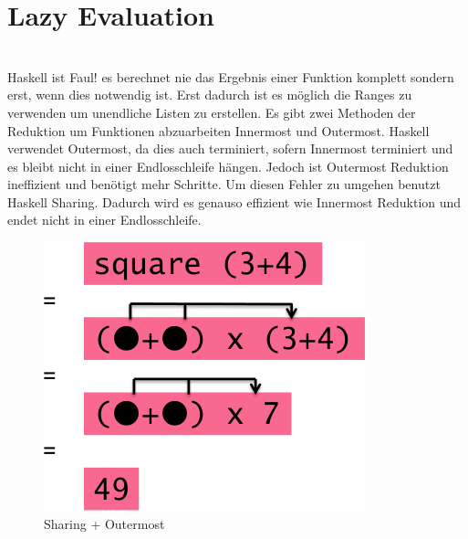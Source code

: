 \section{Lazy Evaluation}\qquad\\
Haskell ist Faul! es berechnet nie das Ergebnis einer Funktion komplett sondern erst, wenn dies notwendig ist. Erst dadurch ist es möglich die Ranges zu verwenden um unendliche Listen zu erstellen. Es gibt zwei Methoden der Reduktion um Funktionen abzuarbeiten Innermost und Outermost. Haskell verwendet Outermost, da dies auch terminiert, sofern Innermost terminiert und es bleibt nicht in einer Endlosschleife hängen.  Jedoch ist Outermost Reduktion ineffizient und benötigt mehr Schritte. Um diesen Fehler zu umgehen benutzt Haskell Sharing. Dadurch wird es genauso effizient wie Innermost Reduktion und endet nicht in einer Endlosschleife.

\begin{figure}[h]
\centering
\includegraphics[width=0.25\linewidth]{mainmatter/pics/sharing}
\caption[Sharing + Outermost]{Sharing + Outermost}
\label{fig:sharing}
\end{figure}


  
  